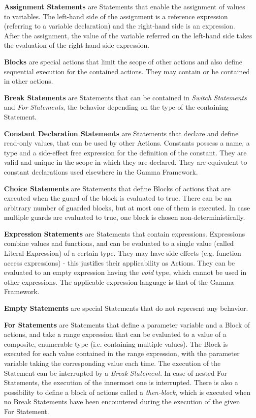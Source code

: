 \textbf{Assignment Statements} are Statements that enable the assignment of values to variables. The left-hand side of the assignment is a reference expression (referring to a variable declaration) and the right-hand side is an expression. After the assignment, the value of the variable referred on the left-hand side takes the evaluation of the right-hand side expression.

\textbf{Blocks} are special actions that limit the scope of other actions and also define sequential execution for the contained actions. They may contain or be contained in other actions.

\textbf{Break Statements} are Statements that can be contained in \textit{Switch Statements} and \textit{For Statements}, the behavior depending on the type of the containing Statement.

\textbf{Constant Declaration Statements} are Statements that declare and define read-only values, that can be used by other Actions. Constants possess a name, a type and a side-effect free expression for the definition of the constant. They are valid and unique in the scope in which they are declared. They are equivalent to constant declarations used  elsewhere in the Gamma Framework.

\textbf{Choice Statements} are Statements that define Blocks of actions that are executed when the guard of the block is evaluated to true. There can be an arbitrary number of guarded blocks, but at most one of them is executed. In case multiple guards are evaluated to true, one block is chosen non-deterministically.

\textbf{Expression Statements} are Statements that contain expressions. Expressions combine values and functions, and can be evaluated to a single value (called Literal Expression) of a certain type. They may have side-effects (e.g. function access expressions) - this justifies their applicability as Actions. They can be evaluated to an empty expression having the \textit{void} type, which cannot be used in other expressions. The applicable expression language is that of the Gamma Framework.

\textbf{Empty Statements} are special Statements that do not represent any behavior.

\textbf{For Statements} are Statements that define a parameter variable and a Block of actions, and take a range expression that can be evaluated to a value of a composite, enumerable type (i.e. containing multiple values). The Block is executed for each value contained in the range expression, with the parameter variable taking the corresponding value each time. The execution of the Statement can be interrupted by a \textit{Break Statement}. In case of nested For Statements, the execution of the innermost one is interrupted. There is also a possibility to define a block of actions called a \textit{then-block}, which is executed when no Break Statements have been encountered during the execution of the given For Statement.

